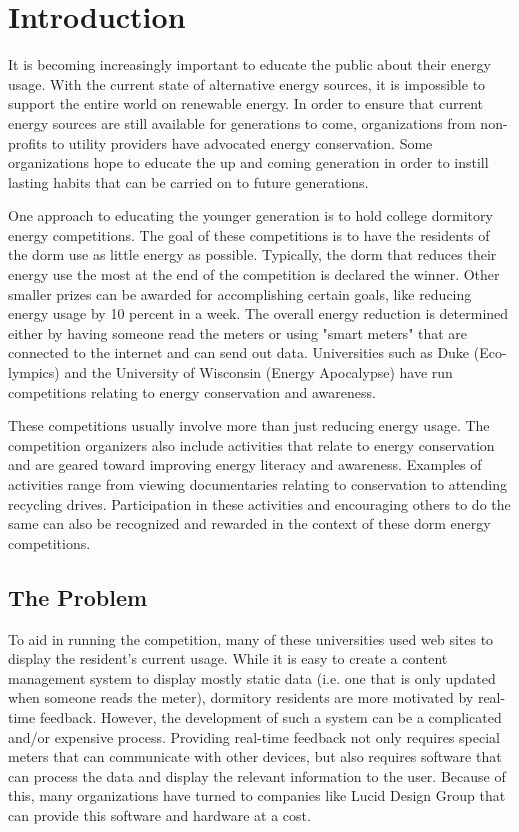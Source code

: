
\chapter{Introduction}
It is becoming increasingly important to educate the public about their energy usage.  With the current state of alternative energy sources, it is impossible to support the entire world on renewable energy.  In order to ensure that current energy sources are still available for generations to come, organizations from non-profits to utility providers have advocated energy conservation.  Some organizations hope to educate the up and coming generation in order to instill lasting habits that can be carried on to future generations.

One approach to educating the younger generation is to hold college dormitory energy competitions.  The goal of these competitions is to have the residents of the dorm use as little energy as possible.  Typically, the dorm that reduces their energy use the most at the end of the competition is declared the winner.  Other smaller prizes can be awarded for accomplishing certain goals, like reducing energy usage by 10 percent in a week.  The overall energy reduction is determined either by having someone read the meters or using "smart meters" that are connected to the internet and can send out data.  Universities such as Duke (Eco-lympics) and the University of Wisconsin (Energy Apocalypse) have run competitions relating to energy conservation and awareness. 

These competitions usually involve more than just reducing energy usage.  The competition organizers also include activities that relate to energy conservation and are geared toward improving energy literacy and awareness.  Examples of activities range from viewing documentaries relating to conservation to attending recycling drives.  Participation in these activities and encouraging others to do the same can also be recognized and rewarded in the context of these dorm energy competitions.

\section{The Problem}

To aid in running the competition, many of these universities used web sites to display the resident's current usage.  While it is easy to create a content management system to display mostly static data (i.e. one that is only updated when someone reads the meter), dormitory residents are more motivated by real-time feedback\cite{oberlin-feedback}.  However, the development of such a system can be a complicated and/or expensive process.  Providing real-time feedback not only requires special meters that can communicate with other devices, but also requires software that can process the data and display the relevant information to the user.  Because of this, many organizations have turned to companies like Lucid Design Group that can provide this software and hardware at a cost.

